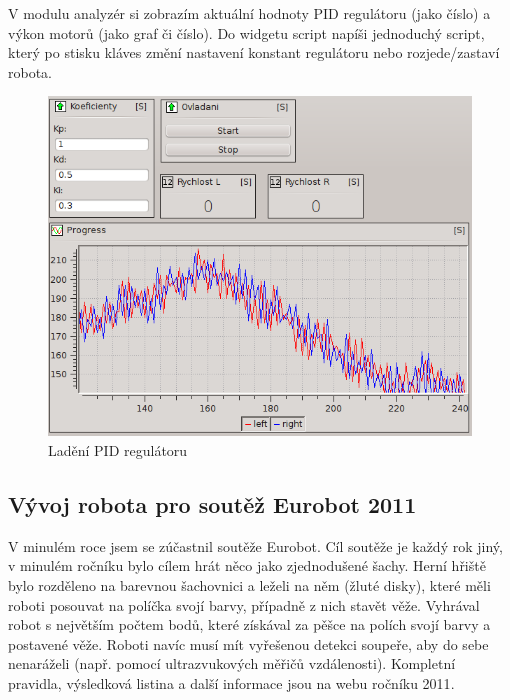 \documentclass[12pt, a4paper, oneside]{article}
\begin{document}
V modulu analyzér si zobrazím aktuální hodnoty PID regulátoru (jako číslo) a výkon motorů (jako graf či číslo). Do widgetu script napíši jednoduchý script, který po stisku kláves změní nastavení konstant regulátoru nebo rozjede/zastaví robota.

\begin{figure}[h]
\begin{center}
\includegraphics[width=\textwidth]{img/use_pid.png}
\caption{Ladění PID regulátoru}
\label{Terminal}
\end{center}
\end{figure}

\newpage
\subsection{Vývoj robota pro soutěž Eurobot 2011}
V minulém roce jsem se zúčastnil soutěže Eurobot\cite{eurobot}. Cíl soutěže je každý rok jiný, v minulém ročníku bylo cílem hrát něco jako zjednodušené šachy. Herní hřiště bylo rozděleno na barevnou šachovnici a leželi na něm  (žluté disky), které měli roboti posouvat na políčka svojí barvy, případně z nich stavět věže. Vyhrával robot s největším počtem bodů, které získával za pěšce na polích svojí barvy a postavené věže. Roboti navíc musí mít vyřešenou detekci soupeře, aby do sebe nenaráželi (např. pomocí ultrazvukových měřičů vzdálenosti). Kompletní pravidla, výsledková listina a další informace jsou na webu ročníku 2011\cite{eurobot11}.
\end{document}
